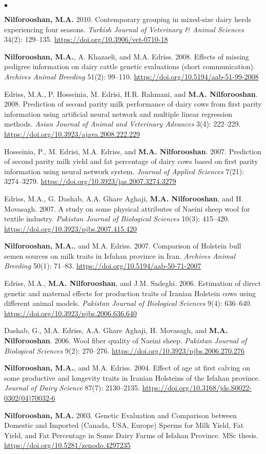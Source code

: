\documentclass[margin,line]{res}
\newenvironment{list2}{
  \begin{list}{$\bullet$}{%
      \setlength{\itemsep}{0in}
      \setlength{\parsep}{0in} \setlength{\parskip}{0in}
      \setlength{\topsep}{0in} \setlength{\partopsep}{0in}
      \setlength{\leftmargin}{0.2in}}}{\end{list}}
\begin{document}
\begin{resume}
\begin{list2}
    \item {\bf Nilforooshan, M.A.} 2010. Contemporary grouping in mixed-size dairy herds experiencing four seasons. {\em Turkish Journal of Veterinary \& Animal Sciences} 34(2): 129--135. \url{https://doi.org/10.3906/vet-0710-18}
    \item {\bf Nilforooshan, M.A.}, A. Khazaeli, and M.A. Edriss. 2008. Effects of missing pedigree information on dairy cattle genetic evaluations (short communication). {\em Archives Animal Breeding} 51(2): 99--110. \url{https://doi.org/10.5194/aab-51-99-2008}
    \item Edriss, M.A., P. Hosseinia, M. Edrisi, H.R. Rahmani, and {\bf M.A. Nilforooshan}. 2008. Prediction of second parity milk performance of dairy cows from first parity information using artificial neural network and multiple linear regression methods. {\em Asian Journal of Animal and Veterinary Advances} 3(4): 222--229. \url{https://doi.org/10.3923/ajava.2008.222.229}
    \item Hosseinia, P., M. Edrisi, M.A. Edriss, and {\bf M.A. Nilforooshan}. 2007. Prediction of second parity milk yield and fat percentage of dairy cows based on first parity information using neural network system. {\em Journal of Applied Sciences} 7(21): 3274--3279. \url{https://doi.org/10.3923/jas.2007.3274.3279}
    \item Edriss, M.A., G. Dashab, A.A. Ghare Aghaji, {\bf M.A. Nilforooshan}, and H. Movasagh. 2007. A study on some physical attributes of Naeini sheep wool for textile industry. {\em Pakistan Journal of Biological Sciences} 10(3): 415--420. \url{https://doi.org/10.3923/pjbs.2007.415.420}
    \item {\bf Nilforooshan, M.A.}, and M.A. Edriss. 2007. Comparison of Holstein bull semen sources on milk traits in Isfahan province in Iran. {\em Archives Animal Breeding} 50(1): 71--83. \url{https://doi.org/10.5194/aab-50-71-2007}
    \item Edriss, M.A., {\bf M.A. Nilforooshan}, and J.M. Sadeghi. 2006. Estimation of direct genetic and maternal effects for production traits of Iranian Holstein cows using different animal models. {\em Pakistan Journal of Biological Sciences} 9(4): 636--640. \url{https://doi.org/10.3923/pjbs.2006.636.640}
    \item Dashab, G., M.A. Edriss, A.A. Ghare Aghaji, H. Movasagh, and {\bf M.A. Nilforooshan}. 2006. Wool fiber quality of Naeini sheep. {\em Pakistan Journal of Biological Sciences} 9(2): 270--276. \url{https://doi.org/10.3923/pjbs.2006.270.276}
    \item {\bf Nilforooshan, M.A.}, and M.A. Edriss. 2004. Effect of age at first calving on some productive and longevity traits in Iranian Holsteins of the Isfahan province. {\em Journal of Dairy Science} 87(7): 2130--2135. \url{https://doi.org/10.3168/jds.S0022-0302(04)70032-6}
    \item {\bf Nilforooshan, M.A.} 2003. Genetic Evaluation and Comparison between Domestic and Imported (Canada, USA, Europe) Sperms for Milk Yield, Fat Yield, and Fat Percentage in Some Dairy Farms of Isfahan Province. MSc thesis. \url{https://doi.org/10.5281/zenodo.4297235}
  \end{list2}

\end{resume}
\end{document}

